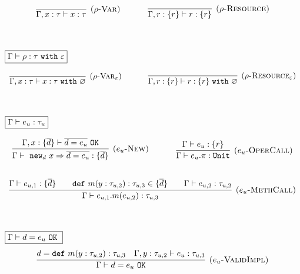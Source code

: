 \documentclass{llncs}
\newcommand{\keywadj}[1]{\mathtt{#1}}
\newcommand{\keyw}[1]{\keywadj{#1}~}
\newcommand{\kwa}[1]{\keywadj{ #1 }}
\newcommand{\type}[2]{
	#1~\keyw{with} #2
}
\begin{document}
\[
\begin{array}{c}

\infer[\textsc{($\rho$-Var)}]
	{\Gamma, x : \tau \vdash x : \tau}
	{}
~~~~~~~~~~
\infer[\textsc{($\rho$-Resource)}]
	{\Gamma, r : \{ r \} \vdash r : \{ r \}}
	{} \\[6ex]

\end{array}
\]

\noindent
$\fbox{$\Gamma \vdash \rho : \type{\tau}{\varepsilon}$}$

\[
\begin{array}{c}

\infer[\textsc{($\rho$-Var$_\varepsilon$)}]
	{\Gamma, x : \tau \vdash x : \type{\tau}{\varnothing}}
	{}
~~~~~~~~~~
\infer[\textsc{($\rho$-Resource$_\varepsilon$)}]
	{\Gamma, r : \{ r \} \vdash r : \type{\{ r \}}{\varnothing}}
	{} \\[6ex]

\end{array}
\]

\noindent
$\fbox{$\Gamma \vdash e_u : \tau_u$}$

\[
\begin{array}{c}
\infer[\textsc{($e_u$-New)}]
	{\Gamma \vdash~\kwa{new}_d~x \Rightarrow \overline{ d = e_u } : \{ \overline{d} \}}
	{\Gamma, x : \{ \overline{d} \} \vdash \overline{d = e_u}~\keywadj{OK}}
~~~~~~~~~~
\infer[\textsc{($e_u$-OperCall)}]
	{\Gamma \vdash e_u.\pi : \keywadj{Unit}}
	{\Gamma \vdash e_u : \{ r \}} \\[5ex]

\infer[\textsc{($e_u$-MethCall)}]
	{\Gamma \vdash e_{u, 1}.m(e_{u, 2}) : \tau_{u, 3}}
	{\Gamma \vdash e_{u, 1} : \{ \overline{ d }\} &~~~ \keyw{def} m(y : \tau_{u, 2}) : \tau_{u, 3} \in \{ \overline{d} \} &~~~  \Gamma \vdash e_{u, 2} : \tau_{u, 2} }\\[6ex]

\end{array}
\]

\noindent
$\fbox{$\Gamma \vdash d = e_u~\keyw{OK}$}$
\[
\begin{array}{c}
\infer[\textsc{($e_u$-ValidImpl)}]
	{\Gamma \vdash d = e_u~\keywadj{OK}}
	{d = \keyw{def} m(y : \tau_{u, 2}) : \tau_{u, 3} & \Gamma, y : \tau_{u, 2} \vdash e_u : \tau_{u, 3}}
	\\[5ex]
\end{array}
\]

\noindent
\fbox{$\Gamma \vdash e : \tau~\keyw{with} \varepsilon$}
\end{document}
